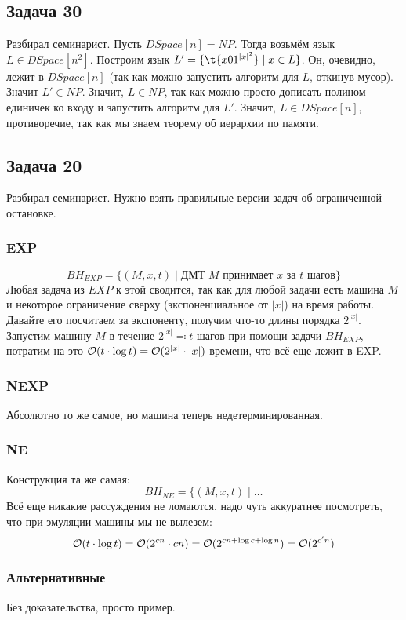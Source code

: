 \subsection{Задача 30}
	Разбирал семинарист.
	Пусть $DSpace[n] = NP$.
	Тогда возьмём язык $L \in DSpace[n^2]$.
	Построим язык $L' = \{ \t{x01^{|x|^2}} \mid x \in L \}$.
	Он, очевидно, лежит в $DSpace[n]$ (так как можно запустить алгоритм для $L$, откинув мусор).
	Значит $L' \in NP$.
	Значит, $L \in NP$, так как можно просто дописать полином единичек ко входу и запустить алгоритм для $L'$.
	Значит, $L \in DSpace[n]$, противоречие, так как мы знаем теорему об иерархии по памяти.

\subsection{Задача 20}
	Разбирал семинарист.
	Нужно взять правильные версии задач об ограниченной остановке.

	\subsubsection{EXP}
		\[ BH_{EXP} = \{ (M, x, t) \mid \text{ДМТ $M$ принимает $x$ за $t$ шагов} \} \]
		Любая задача из $EXP$ к этой сводится, так как для любой задачи есть машина $M$
		и некоторое ограничение сверху (экспоненциальное от $|x|$) на время работы.
		Давайте его посчитаем за экспоненту, получим что-то длины порядка $2^{|x|}$.
		Запустим машину $M$ в течение $2^{|x|} \eqcolon t$ шагов при помощи задачи $BH_{EXP}$,
		потратим на это $\mathcal O(t \cdot \log t)=\mathcal O(2^{|x|} \cdot |x|)$ времени, что всё еще лежит в EXP.

	\subsubsection{NEXP}
		Абсолютно то же самое, но машина теперь недетерминированная.

	\subsubsection{NE}
		Конструкция та же самая:
		\[ BH_{NE} = \{ (M, x, t) \mid \dots \]
		Всё еще никакие рассуждения не ломаются, надо чуть аккуратнее посмотреть, что при эмуляции
		машины мы не вылезем:
		\[ \mathcal O(t \cdot \log t) = \mathcal O(2^{cn} \cdot cn) = \mathcal O(2^{cn+\log c + \log n}) = \mathcal O(2^{c'n})\]

	\subsubsection{Альтернативные}
		Без доказательства, просто пример.

